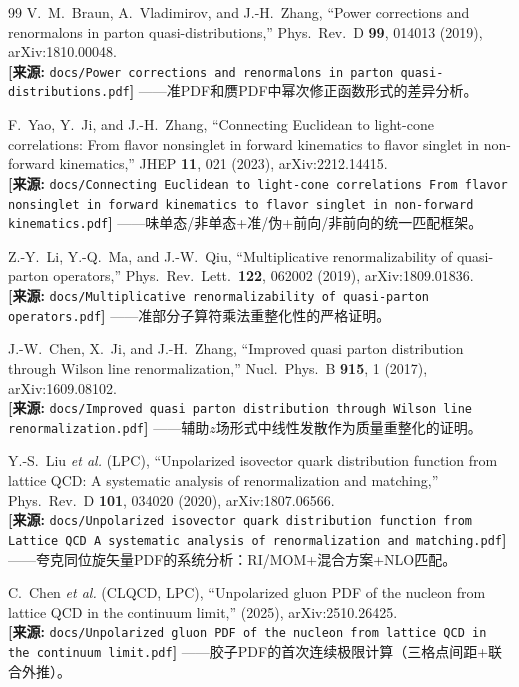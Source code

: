 \documentclass[12pt,a4paper]{ctexart}
\theoremstyle{definition}
\begin{document}
\begin{thebibliography}{99}
V.~M.~Braun, A.~Vladimirov, and J.-H.~Zhang,
``Power corrections and renormalons in parton quasi-distributions,''
Phys.\ Rev.\ D \textbf{99}, 014013 (2019), arXiv:1810.00048.
\\\textbf{[来源:} \texttt{docs/Power corrections and renormalons in parton quasi-distributions.pdf}\textbf{]}
——准PDF和赝PDF中幂次修正函数形式的差异分析。

F.~Yao, Y.~Ji, and J.-H.~Zhang,
``Connecting Euclidean to light-cone correlations: From flavor nonsinglet in forward kinematics to flavor singlet in non-forward kinematics,''
JHEP \textbf{11}, 021 (2023), arXiv:2212.14415.
\\\textbf{[来源:} \texttt{docs/Connecting Euclidean to light-cone correlations From flavor nonsinglet in forward kinematics to flavor singlet in non-forward kinematics.pdf}\textbf{]}
——味单态/非单态+准/伪+前向/非前向的统一匹配框架。

Z.-Y.~Li, Y.-Q.~Ma, and J.-W.~Qiu,
``Multiplicative renormalizability of quasi-parton operators,''
Phys.\ Rev.\ Lett.\ \textbf{122}, 062002 (2019), arXiv:1809.01836.
\\\textbf{[来源:} \texttt{docs/Multiplicative renormalizability of quasi-parton operators.pdf}\textbf{]}
——准部分子算符乘法重整化性的严格证明。

J.-W.~Chen, X.~Ji, and J.-H.~Zhang,
``Improved quasi parton distribution through Wilson line renormalization,''
Nucl.\ Phys.\ B \textbf{915}, 1 (2017), arXiv:1609.08102.
\\\textbf{[来源:} \texttt{docs/Improved quasi parton distribution through Wilson line renormalization.pdf}\textbf{]}
——辅助$z$场形式中线性发散作为质量重整化的证明。

Y.-S.~Liu \textit{et al.} (LPC),
``Unpolarized isovector quark distribution function from lattice QCD: A systematic analysis of renormalization and matching,''
Phys.\ Rev.\ D \textbf{101}, 034020 (2020), arXiv:1807.06566.
\\\textbf{[来源:} \texttt{docs/Unpolarized isovector quark distribution function from Lattice QCD A systematic analysis of renormalization and matching.pdf}\textbf{]}
——夸克同位旋矢量PDF的系统分析：RI/MOM+混合方案+NLO匹配。

C.~Chen \textit{et al.} (CLQCD, LPC),
``Unpolarized gluon PDF of the nucleon from lattice QCD in the continuum limit,''
(2025), arXiv:2510.26425.
\\\textbf{[来源:} \texttt{docs/Unpolarized gluon PDF of the nucleon from lattice QCD in the continuum limit.pdf}\textbf{]}
——胶子PDF的首次连续极限计算（三格点间距+联合外推）。


\end{thebibliography}
\end{document}
